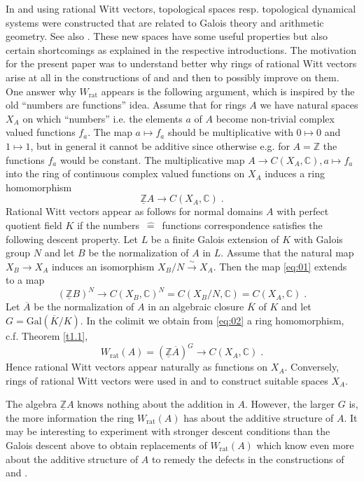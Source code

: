 \documentclass[12pt,leqno]{article}
\newcommand{\C}{{\mathbb{C}}}
\newcommand{\Z}{{\mathbb{Z}}}
\newcommand{\uZ}{\underline{\Z}}
\newcommand{\Gal}{\mathrm{Gal}}
\newcommand{\rat}{\mathrm{rat}}
\newcommand{\onA}{\overline{A}}
\newcommand{\oK}{\overline{K}}
\newcommand{\silo}{\stackrel{\sim}{\rightarrow}}
\newcommand{\ent}{\,\hat{=}\,}
\begin{document}
In \cite{KS} and \cite{D} using rational Witt vectors, topological spaces resp. topological dynamical systems were constructed that are related to Galois theory and arithmetic geometry. See also \cite{L}. These new spaces have some useful properties but also certain shortcomings as explained in the respective introductions. The motivation for the present paper was to understand better why rings of rational Witt vectors arise at all in the constructions of \cite{KS} and \cite{D} and then to possibly improve on them. One answer why $W_{\rat}$ appears is the following argument, which is inspired by the old ``numbers are functions'' idea. Assume that for rings $A$ we have natural spaces $X_A$ on which ``numbers'' i.e. the elements $a$ of $A$ become non-trivial complex valued functions $f_a$. The map $a \mapsto f_a$ should be multiplicative with $0 \mapsto 0$ and $1 \mapsto 1$, but in general it cannot be additive since otherwise e.g. for $A = \Z$ the functions $f_a$ would be constant. The multiplicative map $A \to C (X_A , \C) , a \mapsto f_a$ into the ring of continuous complex valued functions on $X_A$ induces a ring homomorphism
\begin{equation}
\label{eq:01}
\uZ A \longrightarrow C (X_A , \C) \; .
\end{equation}
Rational Witt vectors appear as follows for normal domains $A$ with perfect quotient field $K$ if the numbers $\ent$ functions correspondence satisfies the following descent property. Let $L$ be a finite Galois extension of $K$ with Galois group $N$ and let $B$ be the normalization of $A$ in $L$. Assume that the natural map $X_B \to X_A$ induces an isomorphism $X_B / N \silo X_A$. Then the map \eqref{eq:01} extends to a map
\begin{equation}
\label{eq:02}
(\uZ B)^N \longrightarrow C (X_B , \C)^N = C (X_B / N , \C) = C (X_A , \C) \; .
\end{equation}
Let $\overline{A}$ be the normalization of $A$ in an algebraic closure $\oK$ of $K$ and let $G = \Gal (\oK / K)$. In the colimit we obtain from \eqref{eq:02} a ring homomorphism, c.f. Theorem \ref{t1.1},
\begin{equation}
\label{eq:03}
W_{\rat} (A) = (\uZ \onA)^G \longrightarrow C (X_A , \C) \; .
\end{equation}
Hence rational Witt vectors appear naturally as functions on $X_A$. Conversely, rings of rational Witt vectors were used in \cite{KS} and \cite{D} to construct suitable spaces $X_A$. 

The algebra $\uZ A$ knows nothing about the addition in $A$. However, the larger $G$ is, the more information the ring $W_{\rat} (A)$ has about the additive structure of $A$. It may be interesting to experiment with stronger descent conditions than the Galois descent above to obtain replacements of $W_{\rat} (A)$ which know even more about the additive structure of $A$ to remedy the defects in the constructions of \cite{KS} and \cite{D}.
\end{document}
